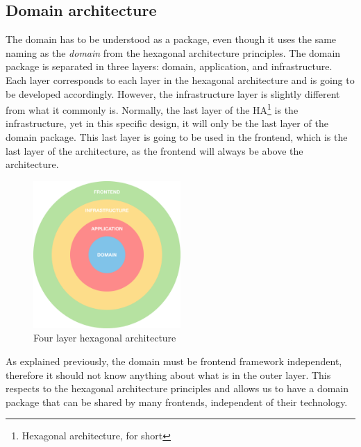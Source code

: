 \documentclass[../design.tex]{subfiles}
\begin{document}
\subsection{Domain architecture}
The domain has to be understood as a package, even though it uses the same
naming as the \emph{domain} from the hexagonal architecture principles. The
domain package is separated in three layers: domain, application, and
infrastructure. Each layer corresponds to each layer in the hexagonal
architecture and is going to be developed accordingly. However, the
infrastructure layer is slightly different from what it commonly is. Normally,
the last layer of the HA\footnote{Hexagonal architecture, for short} is the
infrastructure, yet in this specific design, it will only be the last layer of
the domain package. This last layer is going to be used in the frontend, which
is the last layer of the architecture, as the frontend will always be above the
architecture.
\begin{figure}[H]
	\centering
	\includegraphics[width=0.5\textwidth]{./assets/ha.png}
	\caption{Four layer hexagonal architecture}
\end{figure}
As explained previously, the domain must be frontend framework independent,
therefore it should not know anything about what is in the outer layer. This
respects to the hexagonal architecture principles and allows us to have a domain
package that can be shared by many frontends, independent of their technology.
\end{document}
